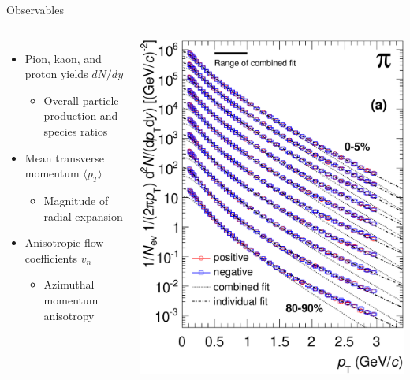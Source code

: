 \documentclass{beamer}
\begin{document}
\begin{frame}{Observables}
  \bigskip
  \begin{columns}
    \begin{itemize}
      \item Pion, kaon, and proton yields $dN/dy$
        \begin{itemize}
          \item Overall particle production and species ratios
        \end{itemize}
      \item Mean transverse momentum $\langle p_T \rangle$
        \begin{itemize}
          \item Magnitude of radial expansion
        \end{itemize}
      \item Anisotropic flow coefficients $v_n$
        \begin{itemize}
          \item Azimuthal momentum anisotropy
        \end{itemize}
    \end{itemize}
    \begin{columns}[c]
      \includegraphics[width=\textwidth]{expdata/alice-spectra-0}

\end{columns}
\end{columns}
\end{frame}
\end{document}
